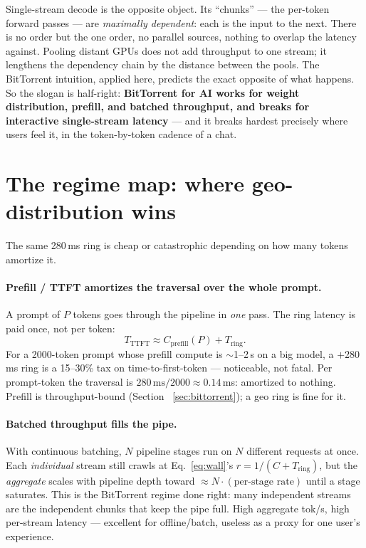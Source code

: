 \documentclass[11pt]{article}
\newcommand{\Tring}{\ensuremath{T_{\mathrm{ring}}}}
\begin{document}
Single-stream decode is the opposite object. Its ``chunks'' --- the per-token forward passes --- are
\emph{maximally dependent}: each is the input to the next. There is no order but the one order, no
parallel sources, nothing to overlap the latency against. Pooling distant GPUs does not add
throughput to one stream; it lengthens the dependency chain by the distance between the pools. The
BitTorrent intuition, applied here, predicts the exact opposite of what happens. So the slogan is
half-right: \textbf{BitTorrent for AI works for weight distribution, prefill, and batched
throughput, and breaks for interactive single-stream latency} --- and it breaks hardest precisely
where users feel it, in the token-by-token cadence of a chat.

\section{The regime map: where geo-distribution wins}
\label{sec:regimes}

The same 280\,ms ring is cheap or catastrophic depending on how many tokens amortize it.

\paragraph{Prefill / TTFT amortizes the traversal over the whole prompt.} A prompt of $P$ tokens
goes through the pipeline in \emph{one} pass. The ring latency is paid once, not per token:
\begin{equation}
T_{\mathrm{TTFT}} \approx C_{\mathrm{prefill}}(P) + \Tring .
\label{eq:ttft}
\end{equation}
For a 2000-token prompt whose prefill compute is $\sim$1--2\,s on a big model, a $+$280\,ms ring is a
15--30\% tax on time-to-first-token --- noticeable, not fatal. Per prompt-token the traversal is
$280\,\text{ms}/2000\approx0.14$\,ms: amortized to nothing. Prefill is throughput-bound (Section~
\ref{sec:bittorrent}); a geo ring is fine for it.

\paragraph{Batched throughput fills the pipe.} With continuous batching, $N$ pipeline stages run on
$N$ different requests at once. Each \emph{individual} stream still crawls at
Eq.~\eqref{eq:wall}'s $r=1/(C+\Tring)$, but the \emph{aggregate} scales with pipeline depth toward
$\approx N\!\cdot\!(\text{per-stage rate})$ until a stage saturates. This is the BitTorrent regime
done right: many independent streams are the independent chunks that keep the pipe full. High
aggregate tok/s, high per-stream latency --- excellent for offline/batch, useless as a proxy for one
user's experience.
\end{document}
